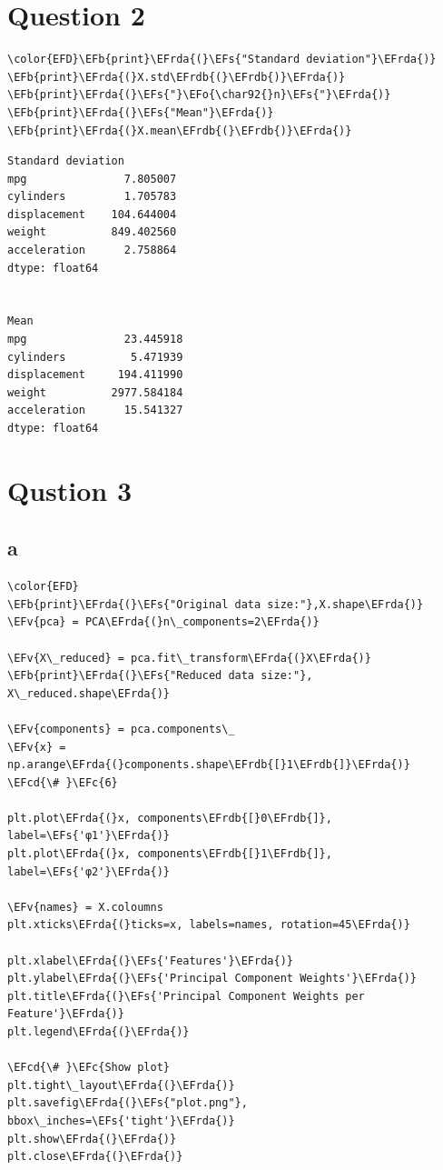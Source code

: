 \documentclass[11pt]{article}
\newcommand{\EFc}[1]{\textcolor{EFc}{#1}} %
\newcommand{\EFcd}[1]{\textcolor{EFcd}{#1}} %
\newcommand{\EFs}[1]{\textcolor{EFs}{#1}} %
\newcommand{\EFb}[1]{\textcolor{EFb}{#1}} %
\newcommand{\EFv}[1]{\textcolor{EFv}{#1}} %
\newcommand{\EFo}[1]{\textcolor{EFo}{#1}} %
\newcommand{\EFrda}[1]{\textcolor{EFrda}{#1}} %
\newcommand{\EFrdb}[1]{\textcolor{EFrdb}{#1}} %
\begin{document}
\section*{Question 2}
\label{sec:org7b61cfc}



\begin{Code}
\begin{Verbatim}
\color{EFD}\EFb{print}\EFrda{(}\EFs{"Standard deviation"}\EFrda{)}
\EFb{print}\EFrda{(}X.std\EFrdb{(}\EFrdb{)}\EFrda{)}
\EFb{print}\EFrda{(}\EFs{"}\EFo{\char92{}n}\EFs{"}\EFrda{)}
\EFb{print}\EFrda{(}\EFs{"Mean"}\EFrda{)}
\EFb{print}\EFrda{(}X.mean\EFrdb{(}\EFrdb{)}\EFrda{)}
\end{Verbatim}
\end{Code}

\begin{verbatim}
Standard deviation
mpg               7.805007
cylinders         1.705783
displacement    104.644004
weight          849.402560
acceleration      2.758864
dtype: float64


Mean
mpg               23.445918
cylinders          5.471939
displacement     194.411990
weight          2977.584184
acceleration      15.541327
dtype: float64
\end{verbatim}

\section*{Qustion 3}
\label{sec:org7e99acc}

\subsection*{a}
\label{sec:orga2f5aee}
\begin{Code}
\begin{Verbatim}
\color{EFD}
\EFb{print}\EFrda{(}\EFs{"Original data size:"},X.shape\EFrda{)}
\EFv{pca} = PCA\EFrda{(}n\_components=2\EFrda{)}

\EFv{X\_reduced} = pca.fit\_transform\EFrda{(}X\EFrda{)}
\EFb{print}\EFrda{(}\EFs{"Reduced data size:"}, X\_reduced.shape\EFrda{)}

\EFv{components} = pca.components\_
\EFv{x} = np.arange\EFrda{(}components.shape\EFrdb{[}1\EFrdb{]}\EFrda{)} \EFcd{\# }\EFc{6}

plt.plot\EFrda{(}x, components\EFrdb{[}0\EFrdb{]}, label=\EFs{'φ1'}\EFrda{)}
plt.plot\EFrda{(}x, components\EFrdb{[}1\EFrdb{]}, label=\EFs{'φ2'}\EFrda{)}

\EFv{names} = X.coloumns
plt.xticks\EFrda{(}ticks=x, labels=names, rotation=45\EFrda{)}

plt.xlabel\EFrda{(}\EFs{'Features'}\EFrda{)}
plt.ylabel\EFrda{(}\EFs{'Principal Component Weights'}\EFrda{)}
plt.title\EFrda{(}\EFs{'Principal Component Weights per Feature'}\EFrda{)}
plt.legend\EFrda{(}\EFrda{)}

\EFcd{\# }\EFc{Show plot}
plt.tight\_layout\EFrda{(}\EFrda{)}
plt.savefig\EFrda{(}\EFs{"plot.png"}, bbox\_inches=\EFs{'tight'}\EFrda{)}
plt.show\EFrda{(}\EFrda{)}
plt.close\EFrda{(}\EFrda{)}
\end{Verbatim}
\end{Code}
\end{document}
